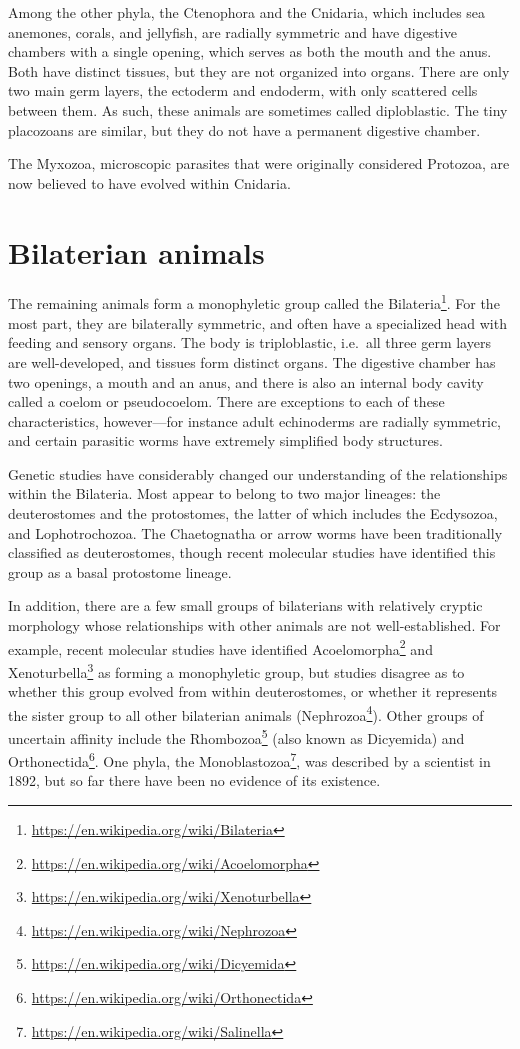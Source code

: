 \documentclass[]{book}
\let\rmarkdownfootnote\footnote%
\def\footnote{\protect\rmarkdownfootnote}
\renewcommand{\href}[2]{#2\footnote{\url{#1}}}
\begin{document}
Among the other phyla, the Ctenophora and the Cnidaria, which includes sea anemones, corals, and jellyfish, are radially symmetric and have digestive chambers with a single opening, which serves as both the mouth and the anus. Both have distinct tissues, but they are not organized into organs. There are only two main germ layers, the ectoderm and endoderm, with only scattered cells between them. As such, these animals are sometimes called diploblastic. The tiny placozoans are similar, but they do not have a permanent digestive chamber.

The Myxozoa, microscopic parasites that were originally considered Protozoa, are now believed to have evolved within Cnidaria.

\hypertarget{bilaterian-animals}{%
\section{Bilaterian animals}\label{bilaterian-animals}}

The remaining animals form a monophyletic group called the \href{https://en.wikipedia.org/wiki/Bilateria}{Bilateria}. For the most part, they are bilaterally symmetric, and often have a specialized head with feeding and sensory organs. The body is triploblastic, i.e.~all three germ layers are well-developed, and tissues form distinct organs. The digestive chamber has two openings, a mouth and an anus, and there is also an internal body cavity called a coelom or pseudocoelom. There are exceptions to each of these characteristics, however---for instance adult echinoderms are radially symmetric, and certain parasitic worms have extremely simplified body structures.

Genetic studies have considerably changed our understanding of the relationships within the Bilateria. Most appear to belong to two major lineages: the deuterostomes and the protostomes, the latter of which includes the Ecdysozoa, and Lophotrochozoa. The Chaetognatha or arrow worms have been traditionally classified as deuterostomes, though recent molecular studies have identified this group as a basal protostome lineage.

In addition, there are a few small groups of bilaterians with relatively cryptic morphology whose relationships with other animals are not well-established. For example, recent molecular studies have identified \href{https://en.wikipedia.org/wiki/Acoelomorpha}{Acoelomorpha} and \href{https://en.wikipedia.org/wiki/Xenoturbella}{Xenoturbella} as forming a monophyletic group, but studies disagree as to whether this group evolved from within deuterostomes, or whether it represents the sister group to all other bilaterian animals (\href{https://en.wikipedia.org/wiki/Nephrozoa}{Nephrozoa}). Other groups of uncertain affinity include the \href{https://en.wikipedia.org/wiki/Dicyemida}{Rhombozoa} (also known as Dicyemida) and \href{https://en.wikipedia.org/wiki/Orthonectida}{Orthonectida}. One phyla, the \href{https://en.wikipedia.org/wiki/Salinella}{Monoblastozoa}, was described by a scientist in 1892, but so far there have been no evidence of its existence.
\end{document}
